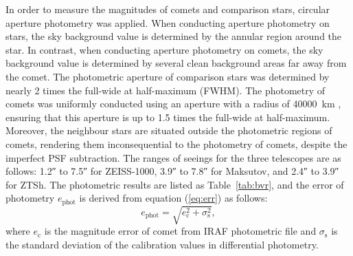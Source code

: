 In order to measure the  magnitudes of comets and comparison stars, circular aperture photometry was applied. When conducting aperture photometry on stars, the sky background value is determined by the annular region around the star. In contrast, when conducting aperture photometry on comets, the sky background value is determined by several clean background areas far away from the comet. The photometric aperture of comparison stars was determined by nearly \num{2} times the full-wide at half-maximum (FWHM). The photometry of comets was uniformly conducted using an aperture with a radius of {\qty{40000}{\km}} , ensuring that this aperture is up to \num{1.5} times the full-wide at half-maximum. Moreover, the neighbour stars are situated outside the photometric regions of comets, rendering them inconsequential to the photometry of comets, despite the imperfect PSF subtraction. 
The ranges of seeings for the three telescopes are as follows: \ang{;;1.2} to \ang{;;7.5} for ZEISS-1000, \ang{;;3.9} to \ang{;;7.8} for Maksutov, and \ang{;;2.4} to \ang{;;3.9} for ZTSh. The photometric results are listed as Table~\ref{tab:bvr}, and the error of photometry $e_{\mathrm{phot}}$ is derived from equation (\ref{eq:err}) as follows: 
\begin{equation}
    e_{\mathrm{phot}} = \sqrt{e_{\mathrm{c}}^{2} + \sigma_\mathrm{s}^2}, 
    \label{eq:err}
\end{equation}
where $e_\mathrm{c}$ is the magnitude error of comet from IRAF photometric file and $\sigma_\mathrm{s}$ is the standard deviation of the calibration values in differential photometry. 






